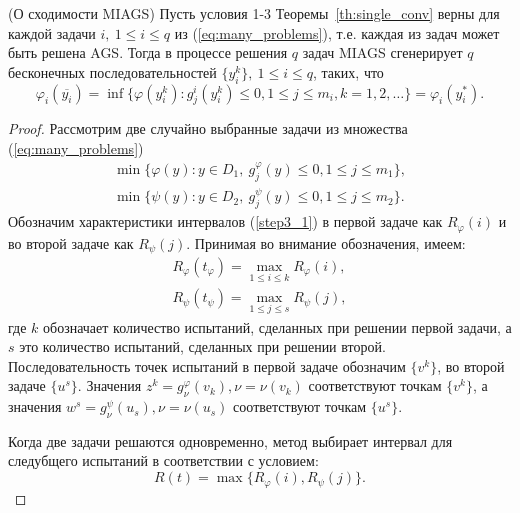 \begin{theorem} (О сходимости MIAGS) Пусть условия 1-3 Теоремы~\ref{th:single_conv} верны для каждой задачи \(i,\:1\leqslant i\leqslant q\) из (\ref{eq:many_problems}),
т.е. каждая из задач может быть решена AGS.
  Тогда в процессе решения \(q\) задач MIAGS сгенерирует
  \(q\) бесконечных последовательностей \(\{y^k_i\},\:1\leqslant i\leqslant q\), таких, что
  \begin{displaymath}
    \varphi_i(\overline{y_i})=\inf\{ \varphi(y^k_i): g^i_j(y^k_i)\leqslant 0,1\leqslant j\leqslant m_i, k=1,2,\dots\}=\varphi_i(y^*_i).
  \end{displaymath}
\end{theorem}
\begin{proof}
  Рассмотрим две случайно выбранные задачи из множества (\ref{eq:many_problems})
  \begin{equation}
      \begin{array}{lr}
        \min\{\varphi(y):y\in D_1,\: g_j^\varphi(y)\leqslant 0, 1\leqslant j\leqslant m_1\}, \\
        \min\{\psi(y):y\in D_2,\: g_j^\psi(y)\leqslant 0, 1\leqslant j\leqslant m_2\}.
      \end{array}
  \end{equation}
  Обозначим характеристики интервалов (\ref{step3_1}) в первой задаче как \(R_\varphi(i)\)
  и во второй задаче как \(R_\psi(j)\). Принимая во внимание обозначения, имеем:
  \begin{equation}
      \begin{array}{lr}
        R_\varphi(t_\varphi)=\max_{1\leqslant i\leqslant k}R_\varphi(i), \\
        R_\psi(t_\psi)=\max_{1\leqslant j\leqslant s}R_\psi(j),
      \end{array}
  \end{equation}
  где \(k\) обозначает количество испытаний, сделанных при решении первой задачи, а \(s\)
  это количество испытаний, сделанных при решении второй. Последовательность точек испытаний
  в первой задаче обозначим \(\{v^k\}\), во второй задаче \(\{u^s\}\).
  Значения \(z^k=g^\varphi_\nu(v_k),\nu =\nu (v_{k})\) соответствуют точкам \(\{v^k\}\),
  а значения \(w^s=g^\psi_\nu(u_s),\nu =\nu(u_{s})\) соответствуют точкам \(\{u^s\}\).

  Когда две задачи решаются одновременно, метод выбирает интервал для следубщего испытаний в
  соответствии с условием:
  \begin{equation}
    R(t) = \max\{R_\varphi(i),R_\psi(j)\}.
  \end{equation}


\end{proof}
